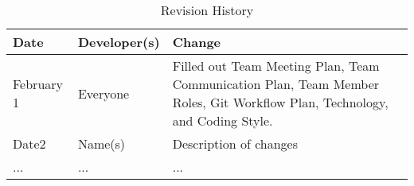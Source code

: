 \documentclass{article}
\begin{document}
\newpage

\begin{table}[hp]
\caption{Revision History} \label{TblRevisionHistory}
\begin{tabularx}{\textwidth}{llX}
\toprule
\textbf{Date} & \textbf{Developer(s)} & \textbf{Change}\\
\midrule
February 1 & Everyone & Filled out Team Meeting Plan, Team Communication Plan, Team Member Roles, Git Workflow Plan, Technology, and Coding Style. \\
Date2 & Name(s) & Description of changes\\
... & ... & ...\\
\bottomrule
\end{tabularx}
\end{table}
\end{document}
